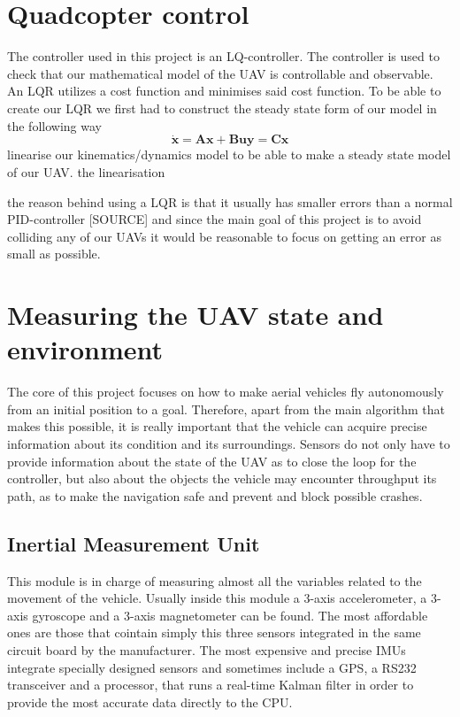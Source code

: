 \documentclass[journal]{IEEEtran}
\begin{document}
	\section{Quadcopter control}
	The controller used in this project is an LQ-controller. The controller is used to check that our mathematical model of the UAV is controllable and observable.  An LQR utilizes a cost function and minimises said cost function. To be able to create our LQR we first had to construct the steady state form of our model in the following way
	\begin{equation} \label{eq:steady_state}
			\bm{\dot x} = \bm{A} \bm{x} + \bm{B} \bm{u}
			\bm{y} = \bm{C} \bm{x}
	\end{equation}
	 linearise our kinematics/dynamics model to be able to make a steady state model of our UAV. the linearisation 
	
	
	
	  the reason behind using a LQR is that it usually has smaller errors than a normal PID-controller [SOURCE] and since the main goal of this project is to avoid colliding any of our UAVs it would be reasonable to focus on getting an error as small as possible.   
	
	\section{Measuring the UAV state and environment}
	The core of this project focuses on how to make aerial vehicles fly autonomously from an initial position to a goal. Therefore, apart from the main algorithm that makes this possible, it is really important that the vehicle can acquire precise information about its condition and its surroundings. Sensors do not only have to provide information about the state of the UAV as to close the loop for the controller, but also about the objects the vehicle may encounter throughput its path, as to make the navigation safe and prevent and block possible crashes.\\

		\subsection{Inertial Measurement Unit}
		This module is in charge of measuring almost all the variables related to the movement of the vehicle. Usually inside this module  a 3-axis accelerometer, a 3-axis gyroscope and a 3-axis magnetometer can be found. The most affordable ones are those that cointain simply this three sensors integrated in the same circuit board by the manufacturer. The most expensive and precise IMUs integrate specially designed sensors and sometimes include a GPS, a RS232 transceiver and a processor, that runs a real-time Kalman filter in order to provide the most accurate data directly to the CPU. \\
		
\end{document}
